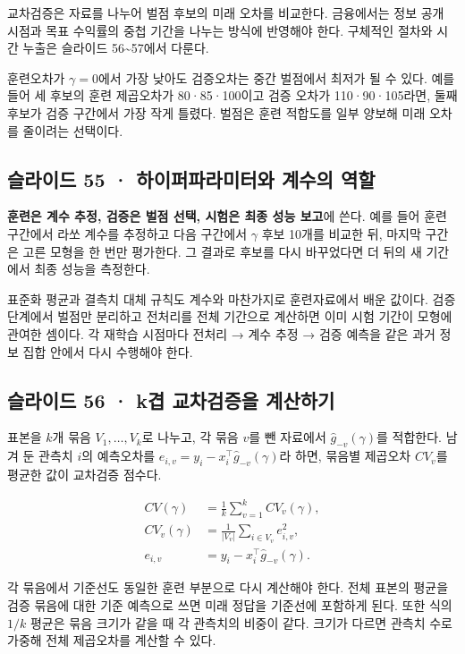 \documentclass[11pt,a4paper]{article}
\begin{document}
교차검증은 자료를 나누어 벌점 후보의 미래 오차를 비교한다. 금융에서는 정보 공개 시점과 목표 수익률의 중첩 기간을 나누는 방식에 반영해야 한다. 구체적인 절차와 시간 누출은 슬라이드 56\~{}57에서 다룬다.\par

훈련오차가 $\gamma=0$에서 가장 낮아도 검증오차는 중간 벌점에서 최저가 될 수 있다. 예를 들어 세 후보의 훈련 제곱오차가 80·85·100이고 검증 오차가 110·90·105라면, 둘째 후보가 검증 구간에서 가장 작게 틀렸다. 벌점은 훈련 적합도를 일부 양보해 미래 오차를 줄이려는 선택이다.\par

\subsection{슬라이드 55 · 하이퍼파라미터와 계수의 역할}
\textbf{훈련은 계수 추정, 검증은 벌점 선택, 시험은 최종 성능 보고}에 쓴다. 예를 들어 훈련 구간에서 라쏘 계수를 추정하고 다음 구간에서 $\gamma$ 후보 10개를 비교한 뒤, 마지막 구간은 고른 모형을 한 번만 평가한다. 그 결과로 후보를 다시 바꾸었다면 더 뒤의 새 기간에서 최종 성능을 측정한다.\par

표준화 평균과 결측치 대체 규칙도 계수와 마찬가지로 훈련자료에서 배운 값이다. 검증 단계에서 벌점만 분리하고 전처리를 전체 기간으로 계산하면 이미 시험 기간이 모형에 관여한 셈이다. 각 재학습 시점마다 전처리 → 계수 추정 → 검증 예측을 같은 과거 정보 집합 안에서 다시 수행해야 한다.\par

\subsection{슬라이드 56 · k겹 교차검증을 계산하기}
표본을 $k$개 묶음 $V_1,\ldots,V_k$로 나누고, 각 묶음 $v$를 뺀 자료에서 $\hat g_{-v}(\gamma)$를 적합한다. 남겨 둔 관측치 $i$의 예측오차를 $e_{i,v}=y_i-x_i^\top\hat g_{-v}(\gamma)$라 하면, 묶음별 제곱오차 $CV_v$를 평균한 값이 교차검증 점수다.\par

\[
\begin{aligned}
CV(\gamma)&=\frac1k\sum_{v=1}^k CV_v(\gamma),\\
CV_v(\gamma)&=\frac1{|V_v|}\sum_{i\in V_v}e_{i,v}^2,\\
e_{i,v}&=y_i-x_i^\top\hat g_{-v}(\gamma).
\end{aligned}
\]

각 묶음에서 기준선도 동일한 훈련 부분으로 다시 계산해야 한다. 전체 표본의 평균을 검증 묶음에 대한 기준 예측으로 쓰면 미래 정답을 기준선에 포함하게 된다. 또한 식의 $1/k$ 평균은 묶음 크기가 같을 때 각 관측치의 비중이 같다. 크기가 다르면 관측치 수로 가중해 전체 제곱오차를 계산할 수 있다.\par
\end{document}
